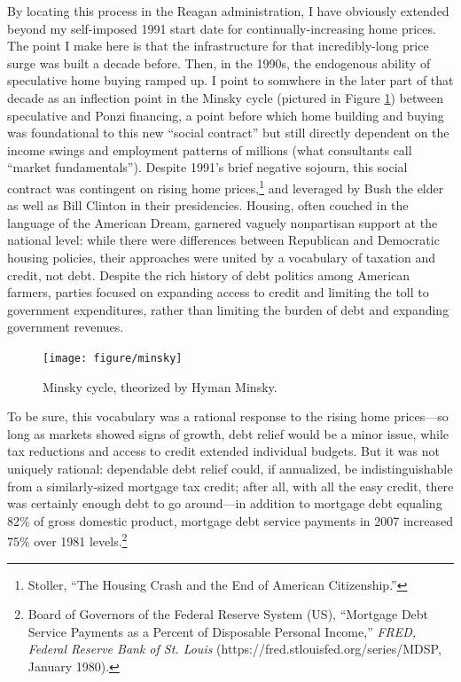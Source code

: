 \documentclass[12pt,oneside]{psthesis}
\begin{document}
By locating this process in the Reagan administration, I have obviously extended beyond my self-imposed 1991 start date for continually-increasing home prices.
The point I make here is that the infrastructure for that incredibly-long price surge was built a decade before.
Then, in the 1990s, the endogenous ability of speculative home buying ramped up.
I point to somwhere in the later part of that decade as an inflection point in the Minsky cycle (pictured in Figure \ref{fig:minsky}) between speculative and Ponzi financing, a point before which home building and buying was foundational to this new ``social contract'' but still directly dependent on the income swings and employment patterns of millions (what consultants call ``market fundamentals'').
Despite 1991's brief negative sojourn, this social contract was contingent on rising home prices,\footnote{Stoller, ``The Housing Crash and the End of American Citizenship.''} and leveraged by Bush the elder as well as Bill Clinton in their presidencies.
Housing, often couched in the language of the American Dream, garnered vaguely nonpartisan support at the national level: while there were differences between Republican and Democratic housing policies, their approaches were united by a vocabulary of taxation and credit, not debt.
Despite the rich history of debt politics among American farmers, parties focused on expanding access to credit and limiting the toll to government expenditures, rather than limiting the burden of debt and expanding government revenues.
\begin{figure}

{\centering \texttt{[image: figure/minsky]} 

}

\caption{Minsky cycle, theorized by Hyman Minsky.}\label{fig:minsky}
\end{figure}
To be sure, this vocabulary was a rational response to the rising home prices---so long as markets showed signs of growth, debt relief would be a minor issue, while tax reductions and access to credit extended individual budgets.
But it was not uniquely rational: dependable debt relief could, if annualized, be indistinguishable from a similarly-sized mortgage tax credit; after all, with all the easy credit, there was certainly enough debt to go around---in addition to mortgage debt equaling 82\% of gross domestic product, mortgage debt service payments in 2007 increased 75\% over 1981 levels.\footnote{Board of Governors of the Federal Reserve System (US), ``Mortgage Debt Service Payments as a Percent of Disposable Personal Income,'' \emph{FRED, Federal Reserve Bank of St. Louis} (https://fred.stlouisfed.org/series/MDSP, January 1980).}
\end{document}
